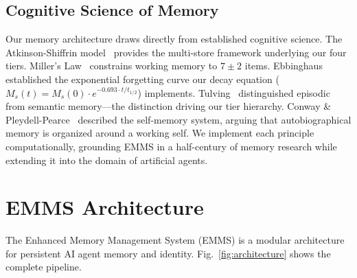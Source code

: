 \documentclass[conference]{IEEEtran}
\begin{document}
\subsection{Cognitive Science of Memory}

Our memory architecture draws directly from established cognitive science. The Atkinson-Shiffrin model~\cite{atkinson1968} provides the multi-store framework underlying our four tiers. Miller's Law~\cite{miller1956} constrains working memory to $7\pm2$ items. Ebbinghaus~\cite{ebbinghaus1885} established the exponential forgetting curve our decay equation ($M_s(t) = M_s(0) \cdot e^{-0.693 \cdot t / t_{1/2}}$) implements. Tulving~\cite{tulving1972} distinguished episodic from semantic memory---the distinction driving our tier hierarchy. Conway \& Pleydell-Pearce~\cite{conway2005} described the self-memory system, arguing that autobiographical memory is organized around a working self. We implement each principle computationally, grounding EMMS in a half-century of memory research while extending it into the domain of artificial agents.

\section{EMMS Architecture}

The Enhanced Memory Management System (EMMS) is a modular architecture for persistent AI agent memory and identity. Fig.~\ref{fig:architecture} shows the complete pipeline.
\end{document}
